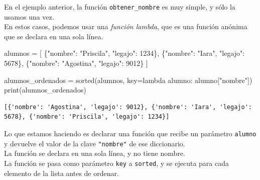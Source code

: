\documentclass[
  letterpaper,
  DIV=11,
  numbers=noendperiod]{scrreprt}
\newenvironment{Shaded}{\begin{snugshade}}{\end{snugshade}}
\newcommand{\BuiltInTok}[1]{\textcolor[rgb]{0.00,0.23,0.31}{#1}}
\newcommand{\DecValTok}[1]{\textcolor[rgb]{0.68,0.00,0.00}{#1}}
\newcommand{\KeywordTok}[1]{\textcolor[rgb]{0.00,0.23,0.31}{#1}}
\newcommand{\NormalTok}[1]{\textcolor[rgb]{0.00,0.23,0.31}{#1}}
\newcommand{\OperatorTok}[1]{\textcolor[rgb]{0.37,0.37,0.37}{#1}}
\newcommand{\StringTok}[1]{\textcolor[rgb]{0.13,0.47,0.30}{#1}}
\begin{document}
\begin{tcolorbox}[enhanced jigsaw, bottomrule=.15mm, leftrule=.75mm, opacityback=0, colback=white, toprule=.15mm, bottomtitle=1mm, opacitybacktitle=0.6, rightrule=.15mm, left=2mm, arc=.35mm, coltitle=black, title=\textcolor{quarto-callout-tip-color}{\faLightbulb}\hspace{0.5em}{Lambda}, breakable, toptitle=1mm, colframe=quarto-callout-tip-color-frame, titlerule=0mm, colbacktitle=quarto-callout-tip-color!10!white]

En el ejemplo anterior, la función \texttt{obtener\_nombre} es muy
simple, y sólo la usamos una vez.\\
En estos casos, podemos usar una \emph{función lambda}, que es una
función anónima que se declara en una sola línea.\\

\begin{Shaded}
\begin{Highlighting}[]
\NormalTok{alumnos }\OperatorTok{=}\NormalTok{ [}
\NormalTok{  \{}\StringTok{"nombre"}\NormalTok{: }\StringTok{"Priscila"}\NormalTok{, }\StringTok{"legajo"}\NormalTok{: }\DecValTok{1234}\NormalTok{\},}
\NormalTok{  \{}\StringTok{"nombre"}\NormalTok{: }\StringTok{"Iara"}\NormalTok{, }\StringTok{"legajo"}\NormalTok{: }\DecValTok{5678}\NormalTok{\},}
\NormalTok{  \{}\StringTok{"nombre"}\NormalTok{: }\StringTok{"Agostina"}\NormalTok{, }\StringTok{"legajo"}\NormalTok{: }\DecValTok{9012}\NormalTok{\}}
\NormalTok{]}

\NormalTok{alumnos\_ordenados }\OperatorTok{=} \BuiltInTok{sorted}\NormalTok{(alumnos, key}\OperatorTok{=}\KeywordTok{lambda}\NormalTok{ alumno: alumno[}\StringTok{"nombre"}\NormalTok{])}
\BuiltInTok{print}\NormalTok{(alumnos\_ordenados)}
\end{Highlighting}
\end{Shaded}

\begin{verbatim}
[{'nombre': 'Agostina', 'legajo': 9012}, {'nombre': 'Iara', 'legajo': 5678}, {'nombre': 'Priscila', 'legajo': 1234}]
\end{verbatim}

Lo que estamos haciendo es declarar una función que recibe un parámetro
\texttt{alumno} y devuelve el valor de la clave \texttt{"nombre"} de ese
diccionario.\\
La función se declara en una sola línea, y no tiene nombre.\\
La función se pasa como parámetro \texttt{key} a \texttt{sorted}, y se
ejecuta para cada elemento de la lista antes de ordenar.

\end{tcolorbox}
\end{document}
